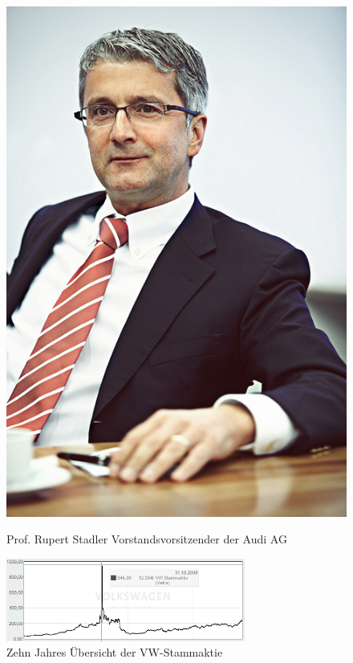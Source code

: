\documentclass[12pt]{article}
\begin{document}
\begin{figure}[here!]
	\centering
	\begin{minipage}[h]{0.20\textwidth}
		\centering
		\includegraphics[width=1.0\textwidth]{images/RupertStadler.jpg}
		\label{fig:vorstandvw8}
	\end{minipage}
	\begin{minipage}[h]{0.10\textwidth}
		\hspace{1cm} 
	\end{minipage}
	\begin{minipage}[h]{0.65\textwidth}
		Prof. Rupert Stadler
		Vorstandsvorsitzender der Audi AG
	\end{minipage}
\end{figure}

\begin{figure}[here!]
	\centering
	\includegraphics[width=0.7\textwidth]{images/finanzen2015S}
	\caption{Zehn Jahres Übersicht der VW-Stammaktie \cite{aktienfotos}}
	\label{fig:vwaktie2}
\end{figure}\FloatBarrier
\end{document}
